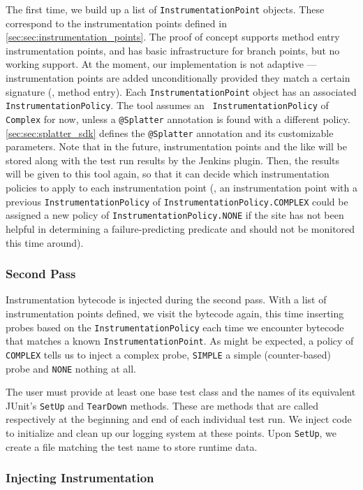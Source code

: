 The first time, we build up a list of {\tt InstrumentationPoint} objects. These
correspond to the instrumentation points defined in
\autoref{sec:sec:instrumentation_points}. The proof of concept supports method
entry instrumentation points, and has basic infrastructure for branch points,
but no working support. At the moment, our implementation is not adaptive ---
instrumentation points are added unconditionally provided they match a certain
signature (\eg, method entry). Each {\tt InstrumentationPoint} object has an
associated {\tt InstrumentationPolicy}. The tool assumes an {\tt
InstrumentationPolicy} of {\tt Complex} for now, unless a {\tt @Splatter}
annotation is found with a different policy. \autoref{sec:sec:splatter_sdk}
defines the {\tt @Splatter} annotation and its customizable parameters. Note
that in the future, instrumentation points and the like will be stored along
with the test run results by the Jenkins plugin. Then, the results will be given
to this tool again, so that it can decide which instrumentation policies to
apply to each instrumentation point (\eg, an instrumentation point with a
previous {\tt InstrumentationPolicy} of {\tt InstrumentationPolicy.COMPLEX}
could be assigned a new policy of {\tt InstrumentationPolicy.NONE} if the site
has not been helpful in determining a failure-predicting predicate and should
not be monitored this time around).

\subsubsection{Second Pass}

Instrumentation bytecode is injected during the second pass. With a list of
instrumentation points defined, we visit the bytecode again, this time inserting
probes based on the {\tt InstrumentationPolicy} each time we encounter bytecode
that matches a known {\tt InstrumentationPoint}. As might be expected, a policy
of {\tt COMPLEX} tells us to inject a complex probe, {\tt SIMPLE} a simple
(counter-based) probe and {\tt NONE} nothing at all.

The user must provide at least one base test class and the names of its
equivalent JUnit's {\tt SetUp} and {\tt TearDown} methods. These are methods
that are called respectively at the beginning and end of each individual test
run. We inject code to initialize and clean up our logging system at these
points. Upon {\tt SetUp}, we create a file matching the test name to store
runtime data.

\subsubsection{Injecting Instrumentation}

